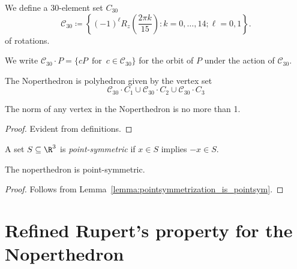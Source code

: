 We define a 30-element set $C_{30}$
\[
    \mathcal{C}_{30} \coloneqq \left\{(-1)^\ell R_z\left(\frac{2\pi k}{15}\right) \colon k=0,\dots,14; \ell=0,1\right\}.
\]
of rotations.

We write $\mathcal{C}_{30} \cdot P = \{c P \,\text{ for } \, c \in \mathcal{C}_{30}\}$ for the orbit of $P$ under the action of $\mathcal{C}_{30}$.

\begin{definition}
\label{def:noperthedron}
\leanok
The Noperthedron is polyhedron given by the vertex set
\[\mathcal{C}_{30} \cdot C_1 \cup \mathcal{C}_{30} \cdot C_2 \cup \mathcal{C}_{30} \cdot C_3\]
\end{definition}

\begin{lemma}
\label{lemma:nopert_verts_norm_le_one}
\leanok
The norm of any vertex in the Noperthedron is no more than 1.
\end{lemma}
\begin{proof}
\leanok
Evident from definitions.
\end{proof}

\begin{definition}
\label{def:pointsymmetric}
\leanok
A set $S \subseteq \R^3$ is {\em point-symmetric} if $x \in S$ implies $-x \in S$.
\end{definition}

\begin{lemma}
\label{lemma:nopert_point_symmetric}
\leanok
{}
The noperthedron is point-symmetric.
\end{lemma}
\begin{proof}
\leanok
{}
Follows from Lemma~\ref{lemma:pointsymmetrization_is_pointsym}.
\end{proof}

\section{Refined Rupert's property for the Noperthedron}

